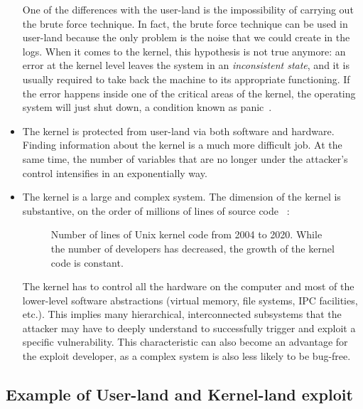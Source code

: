 \documentclass{masterthesis}
\newcommand{\vtnote}[1]{\todo[color=green!20]{#1}}
\begin{document}
\begin{itemize}
One of the differences with the user-land is the impossibility of carrying out the brute force technique. In fact, the brute force technique can be used in user-land because the only problem is the noise that we could create in the logs.
When it comes to the kernel, this hypothesis is not true anymore: an error at the kernel level leaves the system in an \emph{inconsistent state}, and it is usually required to take back the machine to its appropriate functioning.
If the error happens inside one of the critical areas of the kernel, the operating system will just shut down, a condition known as panic~\cite{cheng2021kernel}.
\item The kernel is protected from user-land via both software and hardware. Finding information about the kernel is a much more difficult job. At the same time, the number of variables that are no longer under the attacker’s control intensifies in an exponentially way. 
\item The kernel is a large and complex system. The dimension of the kernel is substantive, on the order of millions of lines of source code ~\cite{codeLinux}:
\begin{figure}[h!]
   \caption{Number of lines of Unix kernel code from 2004 to 2020. While the number of developers has decreased, the growth of the kernel code is constant.}
   \label{line_code_graphview}
\end{figure} 
The kernel has to control all the hardware on the computer and most of the lower-level software abstractions (virtual memory, file systems, IPC facilities, etc.). This implies many hierarchical, interconnected subsystems that the attacker may have to deeply understand to successfully trigger and exploit a specific vulnerability. This characteristic can also become an advantage for the exploit developer, as a complex system is also less likely to be bug-free.
\end{itemize}
\subsection{Example of User-land and Kernel-land exploit}
\label{subsect:example_of_kernel_user_land}
\vtnote{da verificare}
\end{document}
